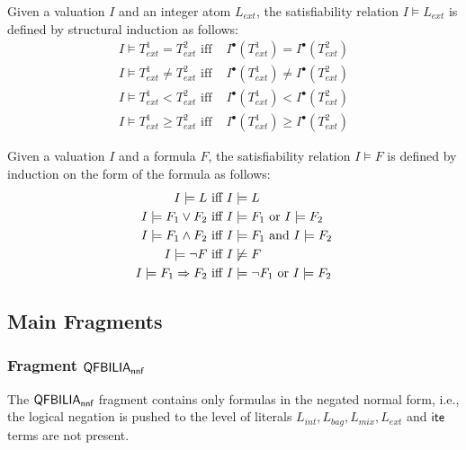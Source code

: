Given a valuation $I$ and an integer atom $L_{ext}$, the satisfiability relation $I \models L_{ext}$ is defined by structural induction as follows:
\begin{align*}
I \models T^1_{ext}=T^2_{ext} \mbox{ iff }& I^{\bullet}(T^1_{ext}) = I^{\bullet}(T^2_{ext}) \\
I \models T^1_{ext}\ne T^2_{ext} \mbox{ iff }& I^{\bullet}(T^1_{ext}) \ne I^{\bullet}(T^2_{ext}) \\
I \models T^1_{ext} < T^2_{ext} \mbox{ iff }& I^{\bullet}(T^1_{ext}) < I^{\bullet}(T^2_{ext}) \\
I \models T^1_{ext}\ge T^2_{ext} \mbox{ iff }& I^{\bullet}(T^1_{ext}) \ge I^{\bullet}(T^2_{ext})
\end{align*}

Given a valuation $I$ and a formula $F$, the satisfiability relation $I \models F$ is defined by induction on the form of the formula  as follows:
\begin{align*}
I \models L \mbox{ iff }& I \models L \\
I \models F_1\lor F_2 \mbox{ iff } & I \models F_1 \mbox{ or } I\models F_2 \\
I \models F_1\land F_2 \mbox{ iff } & I \models F_1 \mbox{ and } I\models F_2 \\
I \models \lnot F \mbox{ iff } & I \not\models F \\
I \models F_1\Rightarrow F_2 \mbox{ iff } & I \models \lnot F_1 \mbox{ or } I\models F_2
\end{align*}

\subsection{Main Fragments}


\subsubsection{Fragment $\textsf{QFBILIA}_{\textsf{nnf}}$}
\label{sssec:nnf}

The $\textsf{QFBILIA}_{\textsf{nnf}}$ fragment contains only formulas in the negated normal form, i.e., the logical negation is pushed to the level of literals $L_{int}, L_{bag}, L_{mix}, L_{ext}$ and $\textsf{ite}$ terms are not present.

